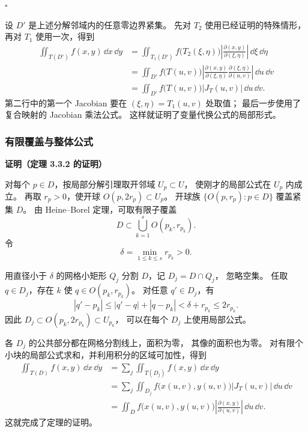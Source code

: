 $\square$



设 $D'$ 是上述分解邻域内的任意零边界紧集。
先对 $T_2$ 使用已经证明的特殊情形，再对 $T_1$ 使用一次，得到
\begin{align*}
\iint_{T(D')}f(x,y)\,\dd x\,\dd y
&=\iint_{T_1(D')}
 f\bigl(T_2(\xi,\eta)\bigr)
 \left|\frac{\partial(x,y)}{\partial(\xi,\eta)}\right|
 \,\dd\xi\,\dd\eta\\
&=\iint_{D'} f\bigl(T(u,v)\bigr)
 \left|\frac{\partial(x,y)}{\partial(\xi,\eta)}
       \frac{\partial(\xi,\eta)}{\partial(u,v)}\right|
 \,\dd u\,\dd v\\
&=\iint_{D'}f\bigl(T(u,v)\bigr)|J_T(u,v)|\,\dd u\,\dd v.
\end{align*}
第二行中的第一个 Jacobian 要在 $(\xi,\eta)=T_1(u,v)$ 处取值；
最后一步使用了复合映射的 Jacobian 乘法公式。
这样就证明了变量代换公式的局部形式。

\subsubsection*{有限覆盖与整体公式}



\textbf{证明（定理 3.3.2 的证明）}


对每个 $p\in D$，按局部分解引理取开邻域 $U_p\subset U$，
使刚才的局部公式在 $U_p$ 内成立。
再取 $r_p>0$，使开球 $O(p,2r_p)\subset U_p$。
开球族 $\{O(p,r_p):p\in D\}$ 覆盖紧集 $D$。
由 Heine--Borel 定理，可取有限子覆盖
\[
D\subset\bigcup_{k=1}^sO(p_k,r_{p_k}).
\]
令
\[
\delta=\min_{1\le k\le s}r_{p_k}>0.
\]

用直径小于 $\delta$ 的网格小矩形 $Q_j$ 分割 $D$，记 $D_j=D\cap Q_j$，
忽略空集。
任取 $q\in D_j$，存在 $k$ 使 $q\in O(p_k,r_{p_k})$。
对任意 $q'\in D_j$，有
\[
|q'-p_k|\le|q'-q|+|q-p_k|<\delta+r_{p_k}\le2r_{p_k}.
\]
因此 $D_j\subset O(p_k,2r_{p_k})\subset U_{p_k}$，
可以在每个 $D_j$ 上使用局部公式。

各 $D_j$ 的公共部分都在网格分割线上，面积为零，
其像的面积也为零。
对有限个小块的局部公式求和，并利用积分的区域可加性，得到
\begin{align*}
\iint_{T(D)}f(x,y)\,\dd x\,\dd y
&=\sum_j\iint_{T(D_j)}f(x,y)\,\dd x\,\dd y\\
&=\sum_j\iint_{D_j}
 f\bigl(x(u,v),y(u,v)\bigr)|J_T(u,v)|\,\dd u\,\dd v\\
&=\iint_D f\bigl(x(u,v),y(u,v)\bigr)
 \left|\frac{\partial(x,y)}{\partial(u,v)}\right|\,\dd u\,\dd v.
\end{align*}
这就完成了定理的证明。



